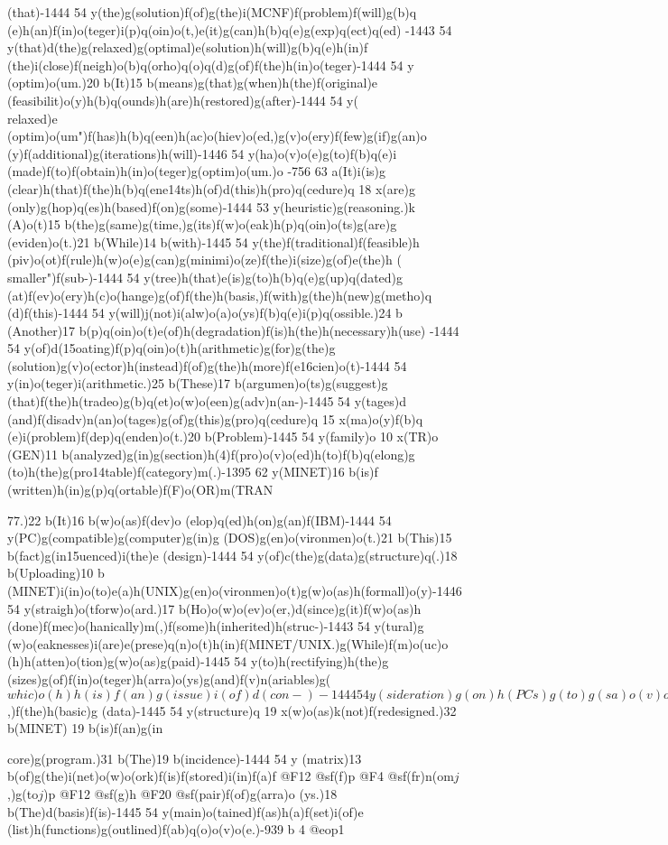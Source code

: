 {{{{{{{{{{{{(that)-1444 54 y(the)g(solution)f(of)g(the)i(MCNF)f(problem)f(will)g(b)q
(e)h(an)f(in)o(teger)i(p)q(oin)o(t,)e(it)g(can)h(b)q(e)g(exp)q(ect)q(ed)
-1443 54 y(that)d(the)g(relaxed)g(optimal)e(solution)h(will)g(b)q(e)h(in)f
(the)i(close)f(neigh)o(b)q(orho)q(o)q(d)g(of)f(the)h(in)o(teger)-1444 54 y
(optim)o(um.)20 b(It)15 b(means)g(that)g(when)h(the)f(original)e
(feasibilit)o(y)h(b)q(ounds)h(are)h(restored)g(after)-1444 54 y(\\relaxed)e
(optim)o(um")f(has)h(b)q(een)h(ac)o(hiev)o(ed,)g(v)o(ery)f(few)g(if)g(an)o
(y)f(additional)g(iterations)h(will)-1446 54 y(ha)o(v)o(e)g(to)f(b)q(e)i
(made)f(to)f(obtain)h(in)o(teger)g(optim)o(um.)o -756 63 a(It)i(is)g
(clear)h(that)f(the)h(b)q(ene\014ts)h(of)d(this)h(pro)q(cedure)q 18 x(are)g
(only)g(hop)q(es)h(based)f(on)g(some)-1444 53 y(heuristic)g(reasoning.)k
(A)o(t)15 b(the)g(same)g(time,)g(its)f(w)o(eak)h(p)q(oin)o(ts)g(are)g
(eviden)o(t.)21 b(While)14 b(with)-1445 54 y(the)f(traditional)f(feasible)h
(piv)o(ot)f(rule)h(w)o(e)g(can)g(minimi)o(ze)f(the)i(size)g(of)e(the)h
(\\smaller")f(sub-)-1444 54 y(tree)h(that)e(is)g(to)h(b)q(e)g(up)q(dated)g
(at)f(ev)o(ery)h(c)o(hange)g(of)f(the)h(basis,)f(with)g(the)h(new)g(metho)q
(d)f(this)-1444 54 y(will)j(not)i(alw)o(a)o(ys)f(b)q(e)i(p)q(ossible.)24 b
(Another)17 b(p)q(oin)o(t)e(of)h(degradation)f(is)h(the)h(necessary)h(use)
-1444 54 y(of)d(\015oating)f(p)q(oin)o(t)h(arithmetic)g(for)g(the)g
(solution)g(v)o(ector)h(instead)f(of)g(the)h(more)f(e\016cien)o(t)-1444 
54 y(in)o(teger)i(arithmetic.)25 b(These)17 b(argumen)o(ts)g(suggest)g
(that)f(the)h(tradeo)g(b)q(et)o(w)o(een)g(adv)n(an-)-1445 54 y(tages)d
(and)f(disadv)n(an)o(tages)g(of)g(this)g(pro)q(cedure)q 15 x(ma)o(y)f(b)q
(e)i(problem)f(dep)q(enden)o(t.)20 b(Problem)-1445 54 y(family)o 10 x(TR)o
(GEN)11 b(analyzed)g(in)g(section)h(4)f(pro)o(v)o(ed)h(to)f(b)q(elong)g
(to)h(the)g(pro\014table)f(category)m(.)-1395 62 y(MINET)16 b(is)f
(written)h(in)g(p)q(ortable)f(F)o(OR)m(TRAN{77.)22 b(It)16 b(w)o(as)f(dev)o
(elop)q(ed)h(on)g(an)f(IBM)-1444 54 y(PC)g(compatible)g(computer)g(in)g
(DOS)g(en)o(vironmen)o(t.)21 b(This)15 b(fact)g(in\015uenced)i(the)e
(design)-1444 54 y(of)c(the)g(data)g(structure)q(.)18 b(Uploading)10 b
(MINET)i(in)o(to)e(a)h(UNIX)g(en)o(vironmen)o(t)g(w)o(as)h(formall)o(y)-1446 
54 y(straigh)o(tforw)o(ard.)17 b(Ho)o(w)o(ev)o(er,)d(since)g(it)f(w)o(as)h
(done)f(mec)o(hanically)m(,)f(some)h(inherited)h(struc-)-1443 54 y(tural)g
(w)o(eaknesses)i(are)e(prese)q(n)o(t)h(in)f(MINET/UNIX.)g(While)f(m)o(uc)o
(h)h(atten)o(tion)g(w)o(as)g(paid)-1445 54 y(to)h(rectifying)h(the)g
(sizes)g(of)f(in)o(teger)h(arra)o(ys)g(and)f(v)n(ariables)g(\(whic)o(h)h
(is)f(an)g(issue)i(of)d(con-)-1444 54 y(sideration)g(on)h(PCs)g(to)g(sa)o
(v)o(e)f(memory)g(and)h(sp)q(eed)h(up)f(computations\),)f(the)h(basic)g
(data)-1445 54 y(structure)q 19 x(w)o(as)k(not)f(redesigned.)32 b(MINET)
19 b(is)f(an)g(in{core)g(program.)31 b(The)19 b(incidence)-1444 54 y
(matrix)13 b(of)g(the)i(net)o(w)o(ork)f(is)f(stored)i(in)f(a)f @F12 @sf(f)p 
@F4 @sf(fr)n(om\(j\),)g(to\(j\))p @F12 @sf(g)h @F20 @sf(pair)f(of)g(arra)o
(ys.)18 b(The)d(basis)f(is)-1445 54 y(main)o(tained)f(as)h(a)f(set)i(of)e
(list)h(functions)g(outlined)f(ab)q(o)o(v)o(e.)-939 b
4 @eop1

}}}}}}}}}}}}}}
